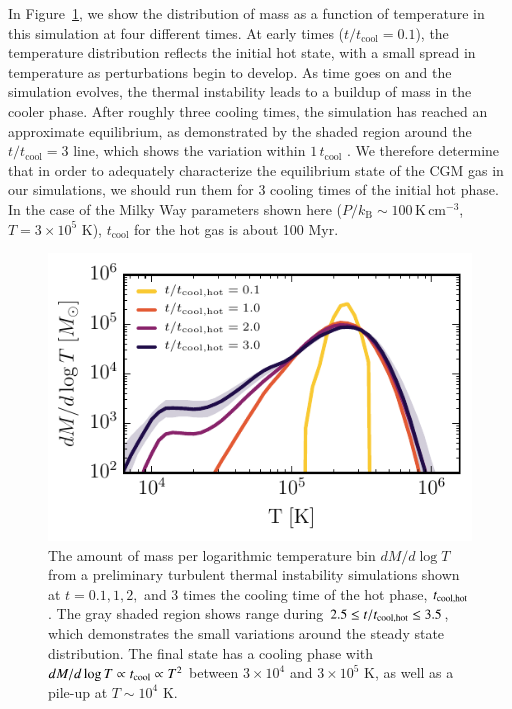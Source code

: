 \documentclass[11pt,letterpaper,english]{article}
\begin{document}
In Figure~\ref{fig:sim_phase}, we show the distribution of mass as a function of temperature in this simulation at four different times. At early times ($t / t_\mathrm{cool} = 0.1$), the temperature distribution reflects the initial hot state, with a small spread in temperature as perturbations begin to develop. As time goes on and the simulation evolves, the thermal instability leads to a buildup of mass in the cooler phase. After roughly three cooling times, the simulation has reached an approximate equilibrium, as demonstrated by the shaded region around the $t / t_\mathrm{cool} = 3$ line, which shows the variation within $1\,t_\mathrm{cool}$ . We therefore determine that in order to adequately characterize the equilibrium state of the CGM gas in our simulations, we should run them for 3 cooling times of the initial hot phase. In the case of the Milky Way parameters shown here ($P/k_\mathrm{B} \sim 100\,\mathrm{K}\,\mathrm{cm}^{-3}$, $T = 3\times10^5$ K), $t_\mathrm{cool}$ for the hot gas is about 100 Myr.

\begin{figure}[t]
    \centering
    \begin{minipage}{0.5\textwidth}
        \includegraphics[width=1.\textwidth]{dMdlogT_proposal_t.pdf} 
    \end{minipage}\hfill
    \begin{minipage}{0.5\textwidth}
	\caption{  The amount of mass per logarithmic temperature bin $dM / d\log T$ from a preliminary turbulent thermal instability simulations shown at $t = 0.1,1,2,$ and $3$ times the cooling time of the hot phase, $t_{\rm cool,hot}$. The gray shaded region shows range during $ 2.5 \leq t / t_{\rm cool,hot} \leq 3.5$, which demonstrates the small variations around the steady state distribution. The final state has a cooling phase with $dM / d\log T \propto t_{\rm cool} \propto T^2$ between $3\times10^4$ and $3\times10^5$ K, as well as a pile-up at $T\sim10^4$ K. \label{fig:sim_phase}}
    \end{minipage}
\end{figure}
\end{document}
